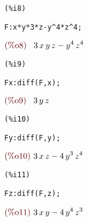 \documentclass[12pt]{article}
\begin{document}
\noindent
\begin{minipage}[t]{8ex}{\color{red}\bf
\begin{verbatim}
(%i8) 
\end{verbatim}}
\end{minipage}
\begin{minipage}[t]{\textwidth}{\color{blue}
\begin{verbatim}
F:x*y*3*z-y^4*z^4;
\end{verbatim}}
\end{minipage}
\begin{math}\displaystyle
\parbox{8ex}{\color{labelcolor}(\%o8) }
3\,x\,y\,z-{y}^{4}\,{z}^{4}
\end{math}


\noindent
\begin{minipage}[t]{8ex}{\color{red}\bf
\begin{verbatim}
(%i9) 
\end{verbatim}}
\end{minipage}
\begin{minipage}[t]{\textwidth}{\color{blue}
\begin{verbatim}
Fx:diff(F,x);
\end{verbatim}}
\end{minipage}
\begin{math}\displaystyle
\parbox{8ex}{\color{labelcolor}(\%o9) }
3\,y\,z
\end{math}


\noindent
\begin{minipage}[t]{8ex}{\color{red}\bf
\begin{verbatim}
(%i10) 
\end{verbatim}}
\end{minipage}
\begin{minipage}[t]{\textwidth}{\color{blue}
\begin{verbatim}
Fy:diff(F,y);
\end{verbatim}}
\end{minipage}
\begin{math}\displaystyle
\parbox{8ex}{\color{labelcolor}(\%o10) }
3\,x\,z-4\,{y}^{3}\,{z}^{4}
\end{math}


\noindent
\begin{minipage}[t]{8ex}{\color{red}\bf
\begin{verbatim}
(%i11) 
\end{verbatim}}
\end{minipage}
\begin{minipage}[t]{\textwidth}{\color{blue}
\begin{verbatim}
Fz:diff(F,z);
\end{verbatim}}
\end{minipage}
\begin{math}\displaystyle
\parbox{8ex}{\color{labelcolor}(\%o11) }
3\,x\,y-4\,{y}^{4}\,{z}^{3}
\end{math}
\end{document}
